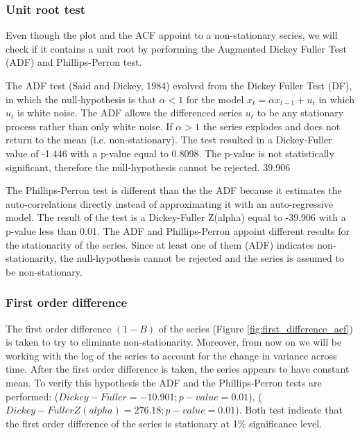 \subsubsection{Unit root test}Even though the plot and the ACF appoint to a non-stationary series, we will check if it contains a unit root by performing the Augmented Dickey Fuller Test (ADF) and Phillips-Perron test. 

The ADF test (Said and Dickey, 1984) evolved from the Dickey Fuller Test (DF), in which the null-hypothesis is that $\alpha<1$ for  the model $x_t=\alpha x_{t-1}+u_t$ in which $u_t$ is white noise. The ADF allows the differenced series $u_t$ to be any stationary process rather than only white noise. If $\alpha>1$ the series explodes and does not return to the mean (i.e. non-stationary). The test resulted in a Dickey-Fuller value of -1.446 with a p-value equal to 0.8098. The p-value is not statistically significant, therefore the null-hypothesis cannot be rejected. 
39.906

The Phillips-Perron test is different than the the ADF because it estimates the auto-correlations directly instead of approximating it with an auto-regressive model. The result of the test is a Dickey-Fuller Z(alpha) equal to -39.906 with a p-value less than 0.01. The ADF and Phillips-Perron appoint different results for the stationarity of the series. Since at least one of them (ADF) indicates non-stationarity, the null-hypothesis cannot be rejected and the series is assumed to be non-stationary. 

\subsubsection{First order difference}
The first order difference $(1-B)$ of the series (Figure \ref{fig:first_difference_acf}) is taken to try to eliminate non-stationarity. Moreover, from now on we will be working with the log of the series to account for the change in variance across time.  After the first order difference is taken, the series appears to have constant mean. To verify this hypothesis the ADF and the Phillips-Perron tests are performed: ($Dickey-Fuller=-10.901; p-value=0.01$), ($Dickey-Fuller Z(alpha)=276.18; p-value=0.01$). Both test indicate that the first order difference of the series is stationary at 1\% significance level. 

